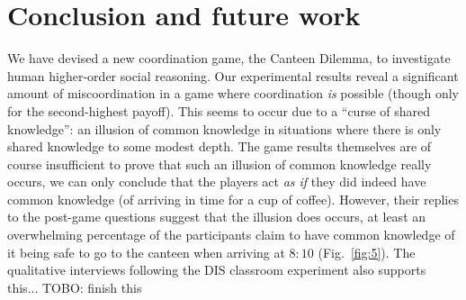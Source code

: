 \documentclass[twocolumn,a4paper,superscriptaddress,nofootinbib]{revtex4}
\newcommand{\tobo}[1]{{\color{red} TOBO: #1}}
\begin{document}
\section{Conclusion and future work} \label{S:conclusion}
We have devised a new coordination game, the Canteen Dilemma, to investigate human higher-order social reasoning. Our experimental results %
reveal a
significant amount of miscoordination in a game where coordination \emph{is} possible (though only for the second-highest payoff). This seems to occur due to a ``curse of shared knowledge'': an illusion of common knowledge in situations where there is only shared knowledge to some modest depth. The game results themselves are of course insufficient to prove that such an illusion of common knowledge really occurs, we can only conclude that the players act \emph{as if} they did indeed have common  knowledge (of arriving in time for a cup of coffee). However, their replies to the post-game questions suggest that the illusion does occurs, at least an overwhelming percentage of the participants claim to have common knowledge of it being safe to go to the canteen when arriving at $8{:}10$ (Fig.~\ref{fig:5}). The qualitative interviews following the DIS classroom experiment also supports this... \tobo{finish this}
\end{document}
